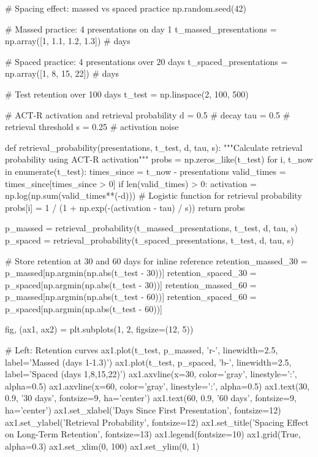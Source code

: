 \documentclass[11pt,a4paper]{article}
\begin{document}
\begin{pycode}
# Spacing effect: massed vs spaced practice
np.random.seed(42)

# Massed practice: 4 presentations on day 1
t_massed_presentations = np.array([1, 1.1, 1.2, 1.3])  # days

# Spaced practice: 4 presentations over 20 days
t_spaced_presentations = np.array([1, 8, 15, 22])  # days

# Test retention over 100 days
t_test = np.linspace(2, 100, 500)

# ACT-R activation and retrieval probability
d = 0.5  # decay
tau = 0.5  # retrieval threshold
s = 0.25  # activation noise

def retrieval_probability(presentations, t_test, d, tau, s):
    """Calculate retrieval probability using ACT-R activation"""
    probs = np.zeros_like(t_test)
    for i, t_now in enumerate(t_test):
        times_since = t_now - presentations
        valid_times = times_since[times_since > 0]
        if len(valid_times) > 0:
            activation = np.log(np.sum(valid_times**(-d)))
            # Logistic function for retrieval probability
            probs[i] = 1 / (1 + np.exp(-(activation - tau) / s))
    return probs

p_massed = retrieval_probability(t_massed_presentations, t_test, d, tau, s)
p_spaced = retrieval_probability(t_spaced_presentations, t_test, d, tau, s)

# Store retention at 30 and 60 days for inline reference
retention_massed_30 = p_massed[np.argmin(np.abs(t_test - 30))]
retention_spaced_30 = p_spaced[np.argmin(np.abs(t_test - 30))]
retention_massed_60 = p_massed[np.argmin(np.abs(t_test - 60))]
retention_spaced_60 = p_spaced[np.argmin(np.abs(t_test - 60))]

fig, (ax1, ax2) = plt.subplots(1, 2, figsize=(12, 5))

# Left: Retention curves
ax1.plot(t_test, p_massed, 'r-', linewidth=2.5, label='Massed (days 1-1.3)')
ax1.plot(t_test, p_spaced, 'b-', linewidth=2.5, label='Spaced (days 1,8,15,22)')
ax1.axvline(x=30, color='gray', linestyle=':', alpha=0.5)
ax1.axvline(x=60, color='gray', linestyle=':', alpha=0.5)
ax1.text(30, 0.9, '30 days', fontsize=9, ha='center')
ax1.text(60, 0.9, '60 days', fontsize=9, ha='center')
ax1.set_xlabel('Days Since First Presentation', fontsize=12)
ax1.set_ylabel('Retrieval Probability', fontsize=12)
ax1.set_title('Spacing Effect on Long-Term Retention', fontsize=13)
ax1.legend(fontsize=10)
ax1.grid(True, alpha=0.3)
ax1.set_xlim(0, 100)
ax1.set_ylim(0, 1)


\end{pycode}
\end{document}
